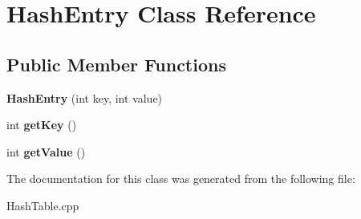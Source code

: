 \hypertarget{classHashEntry}{}\section{Hash\+Entry Class Reference}
\label{classHashEntry}
\subsection*{Public Member Functions}
\begin{DoxyCompactItemize}
\item 
{\bfseries Hash\+Entry} (int key, int value)\hypertarget{classHashEntry_ac78ceaa6e531ebbf3cef97fe9f649222}{}\label{classHashEntry_ac78ceaa6e531ebbf3cef97fe9f649222}

\item 
int {\bfseries get\+Key} ()\hypertarget{classHashEntry_a23c5116baabe73b6612cd12041f1597f}{}\label{classHashEntry_a23c5116baabe73b6612cd12041f1597f}

\item 
int {\bfseries get\+Value} ()\hypertarget{classHashEntry_af43915410e81fba9aed4540fbec13289}{}\label{classHashEntry_af43915410e81fba9aed4540fbec13289}

\end{DoxyCompactItemize}


The documentation for this class was generated from the following file\+:\begin{DoxyCompactItemize}
\item 
Hash\+Table.\+cpp\end{DoxyCompactItemize}
